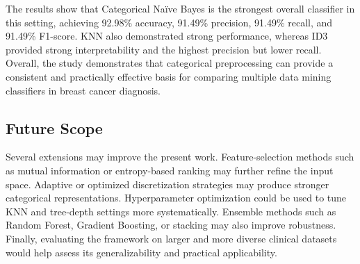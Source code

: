 \documentclass[conference]{IEEEtran}
\begin{document}
The results show that Categorical Na\"ive Bayes is the strongest overall classifier in this setting, achieving 92.98\% accuracy, 91.49\% precision, 91.49\% recall, and 91.49\% F1-score. KNN also demonstrated strong performance, whereas ID3 provided strong interpretability and the highest precision but lower recall. Overall, the study demonstrates that categorical preprocessing can provide a consistent and practically effective basis for comparing multiple data mining classifiers in breast cancer diagnosis.

\subsection{Future Scope}
Several extensions may improve the present work. Feature-selection methods such as mutual information or entropy-based ranking may further refine the input space. Adaptive or optimized discretization strategies may produce stronger categorical representations. Hyperparameter optimization could be used to tune KNN and tree-depth settings more systematically. Ensemble methods such as Random Forest, Gradient Boosting, or stacking may also improve robustness. Finally, evaluating the framework on larger and more diverse clinical datasets would help assess its generalizability and practical applicability.
\end{document}
